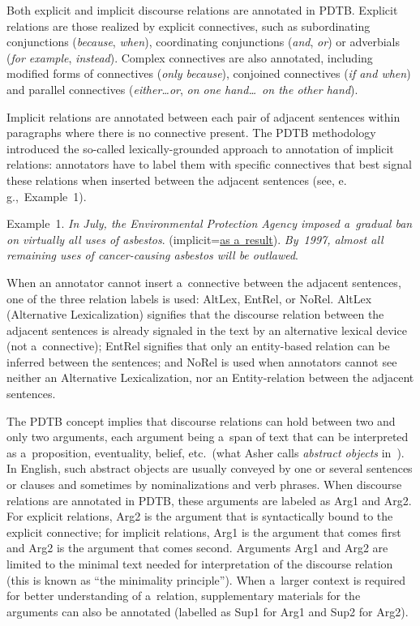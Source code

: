 \begin{multicols}{2}
  Both explicit and implicit discourse relations are annotated in PDTB. Explicit 
relations are those realized by explicit connectives, such as subordinating 
conjunctions (\textit{because}, \textit{when}), coordinating conjunctions 
(\textit{and}, \textit{or}) or adverbials (\textit{for example}, \textit{instead}). 
Complex connectives are also annotated, including modified forms of connectives 
(\textit{only because}), conjoined connectives (\textit{if and when}) and parallel 
connectives (\textit{either\ldots or}, \textit{on one hand\ldots\ on the other hand}).
  
  Implicit relations are annotated between each pair of adjacent sentences within 
paragraphs where there is no connective present. The PDTB methodology introduced the 
so-called lexically-grounded approach to annotation of implicit relations: annotators 
have to label them with specific connectives that best signal these relations when 
inserted between the adjacent sentences  (see, e.\,g.,~Example~1). 
  
  Example~1. \textit{In July, the Environmental Protection Agency imposed a~gradual ban 
on virtually all uses of asbestos}. (implicit\;=\;\underline{as a~result}). \textit{By~1997, 
almost all remaining uses of cancer-causing asbestos will be outlawed}.
  
  When an annotator cannot insert a~connective between the adjacent sentences, one 
of the three relation labels is used: AltLex, EntRel, or NoRel. AltLex (Alternative 
Lexicalization) signifies that the discourse relation between the adjacent sentences is 
already signaled in the text by an alternative lexical device (not a~connective); EntRel 
signifies that only an entity-based relation can be inferred between the sentences; 
and NoRel is used when annotators cannot see neither an Alternative Lexicalization, nor 
an Entity-relation between the adjacent sentences.
  
The  PDTB concept implies that discourse relations can hold between two and only two 
arguments, each argument being a~span of text that can be interpreted as 
a~proposition, eventuality, belief, etc.\ (what Asher calls \textit{abstract objects} 
in~\cite{7-kr}). In English, such abstract objects are usually conveyed by one or 
several sentences or clauses and sometimes by nominalizations and verb phrases. 
When discourse relations are annotated in PDTB, these arguments are labeled as 
Arg1 and Arg2. For explicit relations, Arg2 is the argument that is syntactically 
bound to the explicit connective; for implicit relations, Arg1 is the argument that 
comes first and Arg2 is the argument that comes second. Arguments Arg1 and Arg2 are 
limited to the minimal text needed for interpretation of the discourse relation (this is 
known as ``the minimality principle''). When a~larger context is required for better 
understanding of a~relation, supplementary materials for the arguments can also be 
annotated (labelled as Sup1 for Arg1 and Sup2 for Arg2).
  

\end{multicols}
